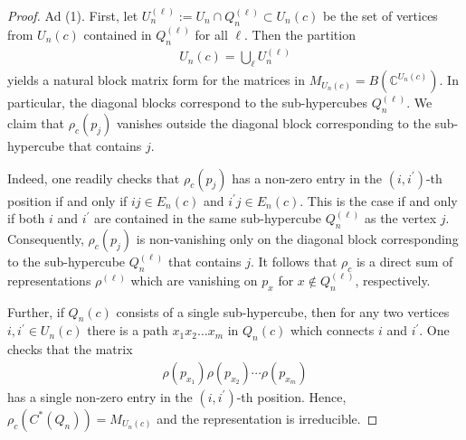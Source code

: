 \documentclass[a4paper]{amsart}
\newcommand{\C}{\mathbb{C}}
\begin{document}
\begin{proof}
    Ad (1). First, let $U_n^{(\ell)} := U_n \cap Q_n^{(\ell)} \subset U_n(c)$ be the set of vertices from $U_n(c)$ contained in $Q_n^{(\ell)}$ for all $\ell$. Then the partition
    \begin{align*}
        U_n(c) = \bigcup_\ell U_n^{(\ell)}
    \end{align*}
    yields a natural block matrix form for the matrices in $M_{U_n(c)} = B(\C^{U_n(c)})$. In particular, the diagonal blocks correspond to the sub-hypercubes $Q_n^{(\ell)}$. We claim that $\rho_c(p_j)$ vanishes outside the diagonal block corresponding to the sub-hypercube that contains $j$. 
    
    Indeed, one readily checks that $\rho_c(p_j)$ has a non-zero entry in the $(i, i^\prime)$-th position if and only if $ij \in E_n(c)$ and $i^\prime j \in E_n(c)$. This is the case if and only if both $i$ and $i^\prime$ are contained in the same sub-hypercube $Q_n^{(\ell)}$ as the vertex $j$. Consequently, $\rho_c(p_j)$ is non-vanishing only on the diagonal block corresponding to the sub-hypercube $Q_n^{(\ell)}$ that contains $j$. It follows that $\rho_c$ is a direct sum of representations $\rho^{(\ell)}$ which are vanishing on $p_x$ for $x \not \in Q_n^{(\ell)}$, respectively.
    
    Further, if $Q_n(c)$ consists of a single sub-hypercube, then for any two vertices $i, i^\prime \in U_n(c)$ there is a path $x_1 x_2 \dots x_m$ in $Q_n(c)$ which connects $i$ and $i^\prime$. One checks that the matrix
    \begin{align*}
        \rho(p_{x_1}) \rho(p_{x_2}) \cdots \rho(p_{x_m})
    \end{align*}
    has a single non-zero entry in the $(i, i^\prime)$-th position. Hence, $\rho_c(C^\ast(Q_n)) = M_{U_n(c)}$ and the representation is irreducible.
    

\end{proof}
\end{document}
